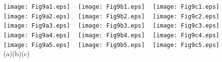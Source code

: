 \documentclass[smallcondensed]{svjour3}     %
\begin{document}
\begin{figure*}[htbp]
  \centering
	\texttt{[image: Fig9a1.eps]}
	~
	\texttt{[image: Fig9b1.eps]}
	~
	\texttt{[image: Fig9c1.eps]}
	\\
	\texttt{[image: Fig9a2.eps]}
	~
	\texttt{[image: Fig9b2.eps]}
	~
	\texttt{[image: Fig9c2.eps]}
	\\
	\texttt{[image: Fig9a3.eps]}
	~
	\texttt{[image: Fig9b3.eps]}
	~
	\texttt{[image: Fig9c3.eps]}
	\\
	\texttt{[image: Fig9a4.eps]}
	~
	\texttt{[image: Fig9b4.eps]}
	~
	\texttt{[image: Fig9c4.eps]}
	\\
	\texttt{[image: Fig9a5.eps]}
	~
	\texttt{[image: Fig9b5.eps]}
	~
	\texttt{[image: Fig9c5.eps]}
	\\
\hspace{0.022\textwidth}(a)\hspace{0.29\textwidth}(b)\hspace{0.33\textwidth}(c)
\caption{Example CNN prediction of time resolved burn maps (a) Simulation burn maps (b) CNN prediction burn maps (c) Performance metrics at six hour intervals}
\label{fig:timeAnalysis}       %
\end{figure*}
\end{document}
